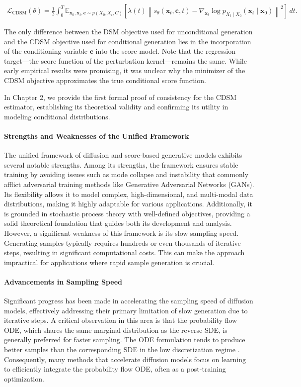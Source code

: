 \begin{align}
    \mathcal{L}_{\text{CDSM}}(\theta) = 
    \frac{1}{2} \int_0^T \mathbb{E}_{\mathbf{x}_0, \mathbf{x}_t, \mathbf{c} \sim p(X_0, X_t, C)} 
    \left[ \lambda(t) \left\| s_\theta(\mathbf{x}_t, \mathbf{c}, t) - \nabla_{\mathbf{x}_t} \log p_{X_t \mid X_0}(\mathbf{x}_t \mid \mathbf{x}_0) \right\|^2 \right] \, dt.
\end{align}

The only difference between the DSM objective used for unconditional generation and the CDSM objective used for conditional generation lies in the incorporation of the conditioning variable \( \mathbf{c} \) into the score model. Note that the regression target—the score function of the perturbation kernel—remains the same. While early empirical results were promising, it was unclear why the minimizer of the CDSM objective approximates the true conditional score function.

In Chapter 2, we provide the first formal proof of consistency for the CDSM estimator, establishing its theoretical validity and confirming its utility in modeling conditional distributions.


\paragraph{Strengths and Weaknesses of the Unified Framework}
The unified framework of diffusion and score-based generative models exhibits several notable strengths. Among its strengths, the framework ensures stable training by avoiding issues such as mode collapse and instability that commonly afflict adversarial training methods like Generative Adversarial Networks (GANs). Its flexibility allows it to model complex, high-dimensional, and multi-modal data distributions, making it highly adaptable for various applications. Additionally, it is grounded in stochastic process theory with well-defined objectives, providing a solid theoretical foundation that guides both its development and analysis. However, a significant weakness of this framework is its slow sampling speed. Generating samples typically requires hundreds or even thousands of iterative steps, resulting in significant computational costs. This can make the approach impractical for applications where rapid sample generation is crucial.

\paragraph{Advancements in Sampling Speed}
Significant progress has been made in accelerating the sampling speed of diffusion models, effectively addressing their primary limitation of slow generation due to iterative steps. A critical observation in this area is that the probability flow ODE, which shares the same marginal distribution as the reverse SDE, is generally preferred for faster sampling. The ODE formulation tends to produce better samples than the corresponding SDE in the low discretization regime \cite{song2020score}. Consequently, many methods that accelerate diffusion models focus on learning to efficiently integrate the probability flow ODE, often as a post-training optimization.

